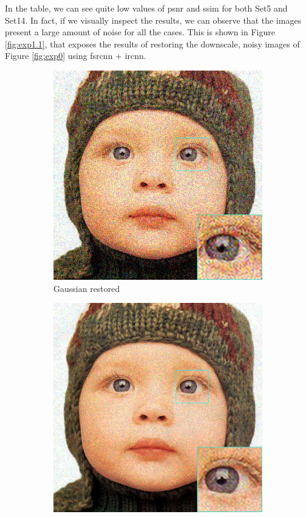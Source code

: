 In the table, we can see quite low values of \gls{psnr} and \gls{ssim} for both Set5 and Set14. In fact, if we visually inspect the results, we can observe that the images present a large amount of noise for all the cases. This is shown in Figure \ref{fig:exp1.1}, that exposes the results of restoring the downscale, noisy images of Figure \ref{fig:exp0} using \gls{fsrcnn} $+$ \gls{ircnn}.

\begin{figure}
	\centering
	\begin{subfigure}{0.24\textwidth}
		\includegraphics[width=\textwidth]{images/exp1.1/gaussian.png}
		\caption{Gaussian restored}
	\end{subfigure}
	\begin{subfigure}{0.24\textwidth}
		\includegraphics[width=\textwidth]{images/exp1.1/poisson.png}

\end{subfigure}
\end{figure}
